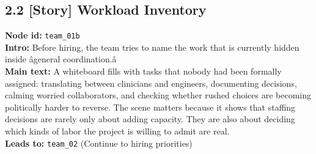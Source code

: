 \documentclass[11pt]{article}
\begin{document}
\subsection*{2.2 [Story] Workload Inventory}
\textbf{Node id:} \texttt{team\_01b}\\
\textbf{Intro:} Before hiring, the team tries to name the work that is currently hidden inside âgeneral coordination.â\\
\textbf{Main text:} A whiteboard fills with tasks that nobody had been formally assigned: translating between clinicians and engineers, documenting decisions, calming worried collaborators, and checking whether rushed choices are becoming politically harder to reverse. The scene matters because it shows that staffing decisions are rarely only about adding capacity. They are also about deciding which kinds of labor the project is willing to admit are real.\\
\textbf{Leads to:} \texttt{team\_02} (Continue to hiring priorities)\\
\end{document}
